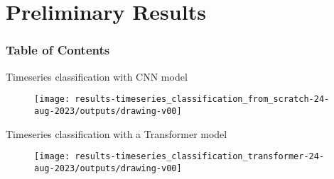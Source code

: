 
\section{Preliminary Results}

\begin{frame}
      \frametitle{Table of Contents}
      \tableofcontents[currentsection]
\end{frame}


{

\begin{frame}{Timeseries classification with CNN model}
      \begin{figure}
        \centering
        \texttt{[image: results-timeseries\_classification\_from\_scratch-24-aug-2023/outputs/drawing-v00]}
      \end{figure}
\end{frame}
}


{

\begin{frame}{Timeseries classification with a Transformer model}
      \begin{figure}
        \centering
        \texttt{[image: results-timeseries\_classification\_transformer-24-aug-2023/outputs/drawing-v00]}
      \end{figure}
\end{frame}
}
